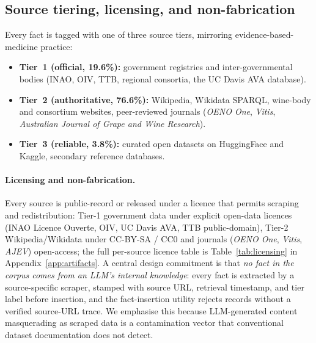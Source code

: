 \subsection{Source tiering, licensing, and non-fabrication}
\label{sec:sources}
Every fact is tagged with one of three source tiers, mirroring
evidence-based-medicine practice:
\begin{itemize}\itemsep -1pt
  \item \textbf{Tier~1 (official, 19.6\%):} government registries and
    inter-governmental bodies (INAO, OIV, TTB, regional consortia, the
    UC Davis AVA database).
  \item \textbf{Tier~2 (authoritative, 76.6\%):} Wikipedia, Wikidata
    SPARQL, wine-body and consortium websites, peer-reviewed journals
    (\emph{OENO One}, \emph{Vitis}, \emph{Australian Journal of Grape
    and Wine Research}).
  \item \textbf{Tier~3 (reliable, 3.8\%):} curated open datasets on
    HuggingFace and Kaggle, secondary reference databases.
\end{itemize}

\paragraph{Licensing and non-fabrication.}
Every source is public-record or released under a licence that permits
scraping and redistribution: Tier-1 government data under explicit
open-data licences (INAO Licence Ouverte, OIV, UC Davis AVA, TTB
public-domain), Tier-2 Wikipedia/Wikidata under CC-BY-SA / CC0 and
journals (\emph{OENO One}, \emph{Vitis}, \emph{AJEV}) open-access; the
full per-source licence table is
Table~\ref{tab:licensing} in Appendix~\ref{app:artifacts}.
A central design commitment is that \emph{no fact in the corpus comes
from an LLM's internal knowledge}: every fact is extracted by a
source-specific scraper, stamped with source URL, retrieval timestamp,
and tier label before insertion, and the fact-insertion utility
rejects records without a verified source-URL trace. We emphasise
this because LLM-generated content masquerading as scraped data is a
contamination vector that conventional dataset documentation does not
detect.


